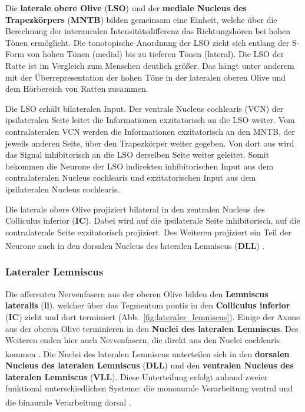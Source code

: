 \documentclass[12pt,a4paper,pdftex]{article}
\begin{document}
Die \textbf{laterale obere Olive} (\textbf{LSO}) und der \textbf{mediale Nucleus des Trapezkörpers} (\textbf{MNTB})  bilden gemeinsam eine Einheit, welche über die Berechnung der interauralen Intensitätsdifferenz das Richtungshören bei hohen Tönen ermöglicht. 
Die tonotopische Anordnung der LSO zieht sich entlang der S-Form von hohen Tönen (medial) bis zu tieferen Tönen (lateral). Die LSO der Ratte ist im Vergleich zum Menschen deutlich größer. Das hängt unter anderem mit der Überrepresentation der hohen Töne in der lateralen oberen Olive und dem Hörbereich von Ratten zusammen.

Die LSO erhält bilateralen Input. Der ventrale Nucleus cochlearis (VCN) der ipsilateralen Seite leitet die Informationen exzitatorisch an die LSO weiter. Vom contralateralen VCN werden die Informationen exzitatorisch an den MNTB, der jeweils anderen Seite, über den Trapezkörper weiter gegeben. Von dort aus wird das Signal inhibitorisch an die LSO derselben Seite weiter geleitet.
Somit bekommen die Neurone der LSO indirekten inhibitorischen Input aus dem contralateralen Nucleus cochlearis und exzitatorischen Input aus dem ipsilateralen Nucleus cochlearis.

Die laterale obere Olive projiziert bilateral in den zentralen Nucleus des Colliculus inferior (\textbf{IC}). Dabei wird auf die ipsilaterale Seite inhibitorisch, auf die contralaterale Seite exzitatorisch projiziert.
Des Weiteren projiziert ein Teil der Neurone auch in den dorsalen Nucleus des lateralen Lemniscus (\textbf{DLL}) \textsuperscript{\cite[29]{paxinos2014rat}}.


\subsubsection*{Lateraler Lemniscus}
Die afferenten Nervenfasern aus der oberen Olive bilden den \textbf{Lemniscus lateralis} (\textbf{ll}), welcher über das Tegmentum pontis in den \textbf{Colliculus inferior} (\textbf{IC})  zieht und dort terminiert (Abb.~\ref{fig:lateraler_lemniscus}). Einige der Axone aus der oberen Olive terminieren in den \textbf{Nuclei des lateralen Lemniscus}. Des Weiteren enden hier auch Nervenfasern, die direkt aus den Nuclei cochlearis kommen \textsuperscript{\cite[10]{crossman2014neuroanatomy}}. 
Die Nuclei des lateralen Lemniscus unterteilen sich in den \textbf{dorsalen Nucleus des lateralen Lemniscus} (\textbf{DLL})  und den \textbf{ventralen Nucleus des lateralen Lemniscus} (\textbf{VLL}).  Diese Unterteilung erfolgt anhand zweier funktional unterschiedlichen Systeme: die monoaurale Verarbeitung ventral und die binaurale Verarbeitung dorsal \textsuperscript{\cite[29]{paxinos2014rat}}. 
\\
\end{document}
